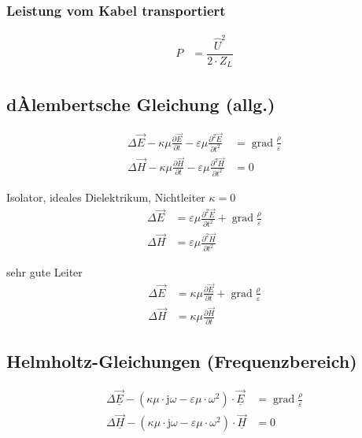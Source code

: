 \subsubsection{Leistung vom Kabel transportiert}

\begin{align*}
    P & = \dfrac{\hat{U}^2}{2\cdot Z_L}
\end{align*}

\subsection{dÀlembertsche Gleichung (allg.)}
\begin{align*}
    \Delta \vec{E}-\kappa \mu \frac{\partial \vec{E}}{\partial t}-\varepsilon \mu \frac{\partial^{2} \vec{E}}{\partial t^{2}} & = \operatorname{grad} \frac{\rho}{\varepsilon} \\
    \Delta \vec{H}-\kappa \mu \frac{\partial \vec{H}}{\partial t}-\varepsilon \mu \frac{\partial^{2} \vec{H}}{\partial t^{2}} & = 0
\end{align*}

Isolator, ideales Dielektrikum, Nichtleiter $\kappa = 0$
\begin{align*}
    \Delta \vec{E} & =\varepsilon \mu \frac{\partial^{2} \vec{E}}{\partial t^{2}}+\operatorname{grad} \frac{\rho}{\varepsilon} \\
    \Delta \vec{H} & =\varepsilon \mu \frac{\partial^{2} \vec{H}}{\partial t^{2}}
\end{align*}

sehr gute Leiter
\begin{align*}
    \Delta \vec{E} & =\kappa \mu \frac{\partial \vec{E}}{\partial t}+\operatorname{grad} \frac{\rho}{\varepsilon} \\
    \Delta \vec{H} & =\kappa \mu \frac{\partial \vec{H}}{\partial t}
\end{align*}

\subsection{Helmholtz-Gleichungen (Frequenzbereich)}
\begin{align*}
    \Delta \underline{\vec{E}}-\left(\kappa \mu \cdot \mathrm{j} \omega-\varepsilon \mu \cdot \omega^{2}\right) \cdot \underline{\vec{E}} & = \operatorname{grad} \frac{\rho}{\varepsilon} \\
    \Delta \underline{\vec{H}}-\left(\kappa \mu \cdot \mathrm{j} \omega-\varepsilon \mu \cdot \omega^{2}\right) \cdot \underline{\vec{H}} & = 0
\end{align*}

